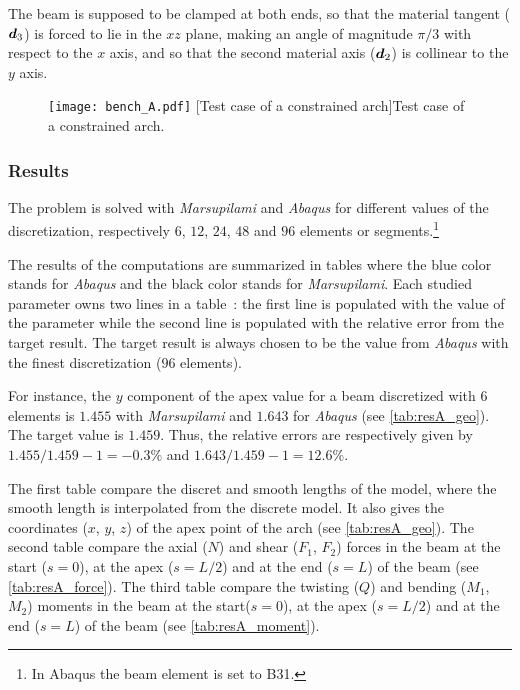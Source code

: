 The beam is supposed to be clamped at both ends, so that the material tangent ($\boldsymbol{d}_3$) is forced to lie in the $xz$ plane, making an angle of magnitude $\pi/3$ with respect to the $x$ axis, and so that the second material axis ($\boldsymbol{d}_2$) is collinear to the $y$ axis.
\begin{figure}[!h]
     	\centering
	\texttt{[image: bench\_A.pdf]}
	[Test case of a constrained arch]{Test case of a constrained arch.}
	\label{fig:bench_arch} 
\end{figure}

\subsubsection{Results}

The problem is solved with \emph{Marsupilami} and \emph{Abaqus} for different values of the discretization, respectively $6$, $12$, $24$, $48$ and $96$ elements or segments.\footnote{In Abaqus the beam element is set to B31.}

The results of the computations are summarized in tables where the blue color stands for \emph{Abaqus} and the black color stands for \emph{Marsupilami}. Each studied parameter owns two lines in a table~: the first line is populated with the value of the parameter while the second line is populated with the relative error from the target result. The target result is always chosen to be the value from \emph{Abaqus} with the finest discretization ($96$ elements).

For instance, the $y$ component of the apex value for a beam discretized with $6$ elements is $1.455$ with \emph{Marsupilami} and $1.643$ for \emph{Abaqus} (see \cref{tab:resA_geo}). The target value is $1.459$. Thus, the relative errors are respectively given by $1.455/1.459 -1 = -0.3\%$ and $1.643/1.459 -1 = 12.6\%$.

The first table compare the discret and smooth lengths of the model, where the smooth length is interpolated from the discrete model. It also gives the coordinates ($x$, $y$, $z$) of the apex point of the arch (see \cref{tab:resA_geo}). The second table compare the axial ($N$) and shear ($F_1$, $F_2$) forces in the beam at the start ($s=0$), at the apex ($s=L/2$) and at the end ($s=L$) of the beam (see \cref{tab:resA_force}). The third table compare the twisting ($Q$) and bending ($M_1$, $M_2$) moments in the beam at the start($s=0$), at the apex ($s=L/2$) and at the end ($s=L$) of the beam (see \cref{tab:resA_moment}).

